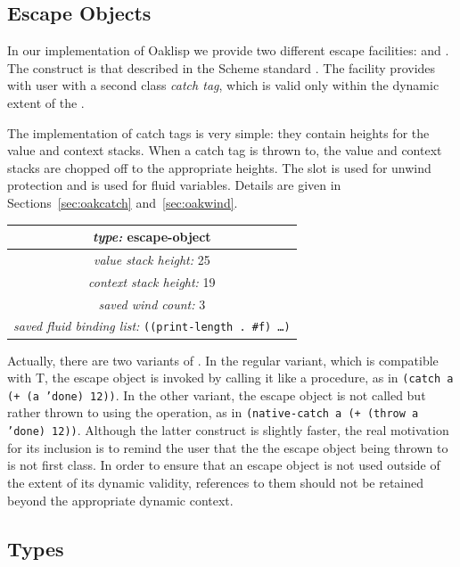 \subsection{Escape Objects} \label{sec:ctagform}

In our implementation of Oaklisp we provide two different escape
facilities:  and .  The  construct
is that described in the Scheme standard \citep{R3RS}.  The 
facility provides with user with a second class \emph{catch tag}, which
is valid only within the dynamic extent of the .

The implementation of catch tags is very simple: they contain heights
for the value and context stacks.  When a catch tag is thrown to, the
value and context stacks are chopped off to the appropriate heights.
The slot  is used for unwind protection and
 is used for fluid variables.  Details
are given in Sections~\ref{sec:oakcatch} and~\ref{sec:oakwind}.

\begin{center}
\begin{tabular}{|c|}\hline
\emph{type:} escape-object \\\hline
\emph{value stack height:} 25 \\\hline
\emph{context stack height:} 19 \\\hline
\emph{saved wind count:} 3 \\\hline
\emph{saved fluid binding list:} \tt ((print-length . \#f) \ldots)\\\hline
\end{tabular}
\end{center}

Actually, there are two variants of .  In the regular
variant, which is compatible with T, the escape object is invoked by
calling it like a procedure, as in \texttt{(catch a (+ (a 'done) 12))}.
In the other variant, the escape object is not called but rather
thrown to using the  operation, as in \texttt{(native-catch a
(+ (throw a 'done) 12))}.  Although the latter construct is slightly
faster, the real motivation for its inclusion is to remind the user
that the the escape object being thrown to is not first class.  In
order to ensure that an escape object is not used outside of the
extent of its dynamic validity, references to them should not be
retained beyond the appropriate dynamic context.

\subsection{Types}

